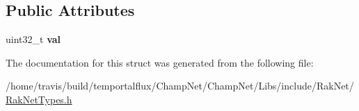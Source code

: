 \subsection*{Public Attributes}
\begin{DoxyCompactItemize}
\item 
\hypertarget{struct_rak_net_1_1uint24__t_abd4b9062ece4fe226fb8ec1cd237062b}{uint32\-\_\-t {\bfseries val}}\label{struct_rak_net_1_1uint24__t_abd4b9062ece4fe226fb8ec1cd237062b}

\end{DoxyCompactItemize}


The documentation for this struct was generated from the following file\-:\begin{DoxyCompactItemize}
\item 
/home/travis/build/temportalflux/\-Champ\-Net/\-Champ\-Net/\-Libs/include/\-Rak\-Net/\hyperlink{_rak_net_types_8h}{Rak\-Net\-Types.\-h}\end{DoxyCompactItemize}
